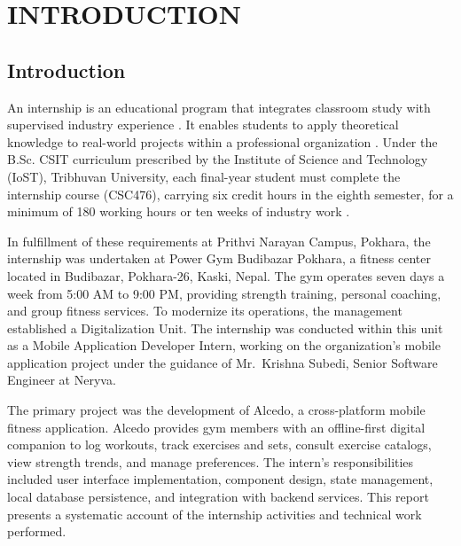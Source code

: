 \chapter{INTRODUCTION}

\section{Introduction}
An internship is an educational program that integrates classroom study with supervised industry experience \citep{parveen2012}. It enables students to apply theoretical knowledge to real-world projects within a professional organization \citep{nace2022}. Under the B.Sc. CSIT curriculum prescribed by the Institute of Science and Technology (IoST), Tribhuvan University, each final-year student must complete the internship course (CSC476), carrying six credit hours in the eighth semester, for a minimum of 180 working hours or ten weeks of industry work \citep{tu2022curriculum}.

In fulfillment of these requirements at Prithvi Narayan Campus, Pokhara, the internship was undertaken at Power Gym Budibazar Pokhara, a fitness center located in Budibazar, Pokhara-26, Kaski, Nepal. The gym operates seven days a week from 5:00 AM to 9:00 PM, providing strength training, personal coaching, and group fitness services. To modernize its operations, the management established a Digitalization Unit. The internship was conducted within this unit as a Mobile Application Developer Intern, working on the organization's mobile application project under the guidance of Mr.~Krishna Subedi, Senior Software Engineer at Neryva.

The primary project was the development of Alcedo, a cross-platform mobile fitness application. Alcedo provides gym members with an offline-first digital companion to log workouts, track exercises and sets, consult exercise catalogs, view strength trends, and manage preferences. The intern's responsibilities included user interface implementation, component design, state management, local database persistence, and integration with backend services. This report presents a systematic account of the internship activities and technical work performed.

